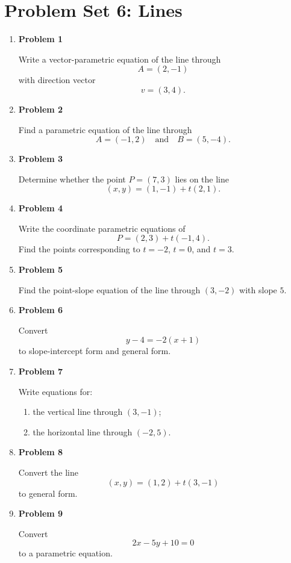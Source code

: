 \section{Problem Set 6: Lines}

\begin{enumerate}
\item \textbf{Problem 1}\par
Write a vector-parametric equation of the line through
\[
A=(2,-1)
\]
with direction vector
\[
v=(3,4).
\]

\item \textbf{Problem 2}\par
Find a parametric equation of the line through
\[
A=(-1,2)
\quad\text{and}\quad
B=(5,-4).
\]

\item \textbf{Problem 3}\par
Determine whether the point \(P=(7,3)\) lies on the line
\[
(x,y)=(1,-1)+t(2,1).
\]

\item \textbf{Problem 4}\par
Write the coordinate parametric equations of
\[
P=(2,3)+t(-1,4).
\]
Find the points corresponding to \(t=-2\), \(t=0\), and \(t=3\).

\item \textbf{Problem 5}\par
Find the point-slope equation of the line through \((3,-2)\) with slope \(5\).

\item \textbf{Problem 6}\par
Convert
\[
y-4=-2(x+1)
\]
to slope-intercept form and general form.

\item \textbf{Problem 7}\par
Write equations for:
\begin{enumerate}
\item the vertical line through \((3,-1)\);
\item the horizontal line through \((-2,5)\).
\end{enumerate}

\item \textbf{Problem 8}\par
Convert the line
\[
(x,y)=(1,2)+t(3,-1)
\]
to general form.

\item \textbf{Problem 9}\par
Convert
\[
2x-5y+10=0
\]
to a parametric equation.


\end{enumerate}
